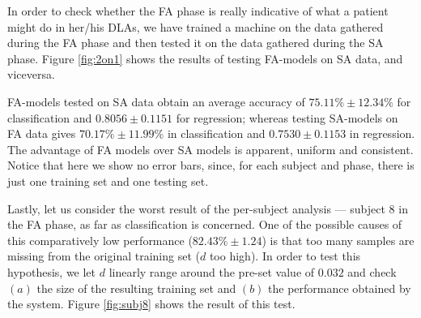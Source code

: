 \documentclass[10pt]{bmc_article}
\def\texttt{[image: ]}
\newenvironment{bmcformat}{\begin{raggedright}\baselineskip20pt\sloppy\setboolean{publ}{false}}{\end{raggedright}\baselineskip20pt\sloppy}
\begin{document}
\begin{bmcformat}
In order to check whether the FA phase is really indicative of what
a patient might do in her/his DLAs, we have trained a
machine on the data gathered during the FA phase and then tested it
on the data gathered during the SA phase. Figure \ref{fig:2on1} shows the
results of testing FA-models on SA data, and viceversa.


FA-models tested on SA data obtain an average accuracy of $75.11\% \pm 12.34\%$
for classification and $0.8056 \pm 0.1151$ for regression;
whereas testing SA-models on FA data gives $70.17\% \pm 11.99\%$ in classification
and $0.7530 \pm 0.1153$ in regression. The advantage of FA models over SA models
is apparent, uniform and consistent. Notice that here we show no error bars,
since, for each subject and phase, there is just one training set and one testing set.

Lastly, let us consider the worst result of the per-subject analysis
--- subject $8$ in the FA phase, as far as classification is concerned.
One of the possible causes of this comparatively low performance
($82.43\% \pm 1.24$) is that too many samples are missing from the
original training set ($d$ too high). In order to test this hypothesis,
we let $d$ linearly range around the pre-set value of $0.032$ and check
$(a)$ the size of the resulting training set and $(b)$ the performance
obtained by the system. Figure \ref{fig:subj8} shows the result of
this test.



\end{bmcformat}
\end{document}
